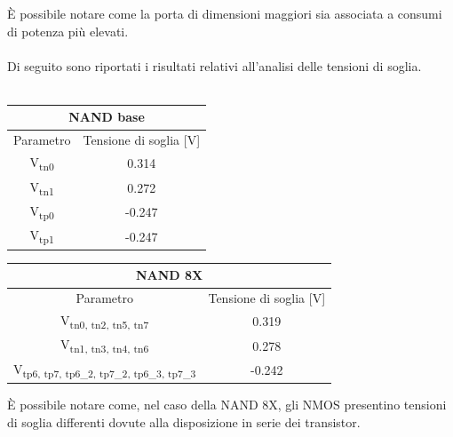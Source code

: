 \documentclass[11pt,  english, makeidx, a4paper, titlepage, oneside]{book}
\begin{document}
\vspace{0.3cm}
È possibile notare come la porta di dimensioni maggiori sia associata a consumi di potenza più elevati. 
\\\\
Di seguito sono riportati i risultati relativi all'analisi delle tensioni di soglia.
\\\\
\begin{center}
	\begin{tabular}{|c|c|}
	\hline
	 \multicolumn{2}{|c|}{NAND base} \\
	\hline
	Parametro & Tensione di soglia [V] \\
	\hline
	 V\textsubscript{tn0} & 0.314\\
	\hline
	 V\textsubscript{tn1} & 0.272 \\
	\hline
	V\textsubscript{tp0} & -0.247 \\
	\hline
	V\textsubscript{tp1} & -0.247 \\
	\hline
	\end{tabular}	
	\begin{tabular}{|c|c|}
	\hline
	 \multicolumn{2}{|c|}{NAND 8X} \\
	\hline
	Parametro & Tensione di soglia [V] \\
	\hline
	 V\textsubscript{tn0, tn2, tn5, tn7} & 0.319\\
	\hline
	 V\textsubscript{tn1, tn3, tn4, tn6} & 0.278 \\
	\hline
	V\textsubscript{tp6, tp7, tp6\_2, tp7\_2, tp6\_3, tp7\_3} & -0.242 \\
	\hline
	\end{tabular}
\end{center}
\vspace{0.3cm}
È possibile notare come, nel caso della NAND 8X, gli NMOS presentino tensioni di soglia differenti dovute alla disposizione in serie dei transistor.
\newpage
\end{document}
